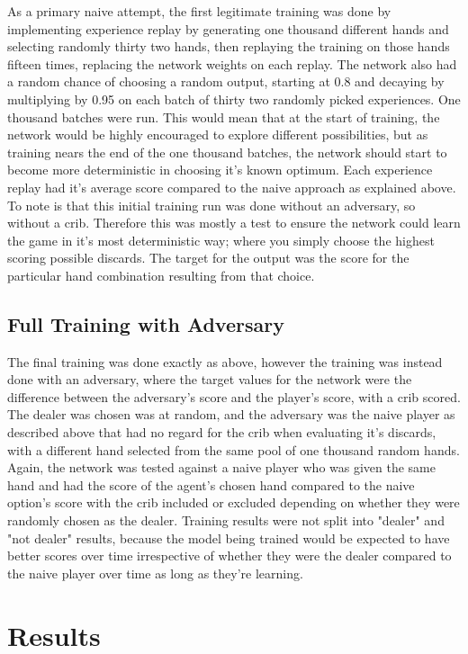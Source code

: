\documentclass[]{article}
\begin{document}
As a primary naive attempt, the first legitimate training was done by implementing experience replay by generating one thousand different hands and selecting randomly thirty two hands, then replaying the training on those hands fifteen times, replacing the network weights on each replay. The network also had a random chance of choosing a random output, starting at 0.8 and decaying by multiplying by 0.95 on each batch of thirty two randomly picked experiences. One thousand batches were run. This would mean that at the start of training, the network would be highly encouraged to explore different possibilities, but as training nears the end of the one thousand batches, the network should start to become more deterministic in choosing it's known optimum. Each experience replay had it's average score compared to the naive approach as explained above. To note is that this initial training run was done without an adversary, so without a crib. Therefore this was mostly a test to ensure the network could learn the game in it's most deterministic way; where you simply choose the highest scoring possible discards. The target for the output was the score for the particular hand combination resulting from that choice.

\subsection{Full Training with Adversary}

The final training was done exactly as above, however the training was instead done with an adversary, where the target values for the network were the difference between the adversary's score and the player's score, with a crib scored. The dealer was chosen was at random, and the adversary was the naive player as described above that had no regard for the crib when evaluating it's discards, with a different hand selected from the same pool of one thousand random hands. Again, the network was tested against a naive player who was given the same hand and had the score of the agent's chosen hand compared to the naive option's score with the crib included or excluded depending on whether they were randomly chosen as the dealer. Training results were not split into "dealer" and "not dealer" results, because the model being trained would be expected to have better scores over time irrespective of whether they were the dealer compared to the naive player over time as long as they're learning.

\section{Results}
\end{document}
